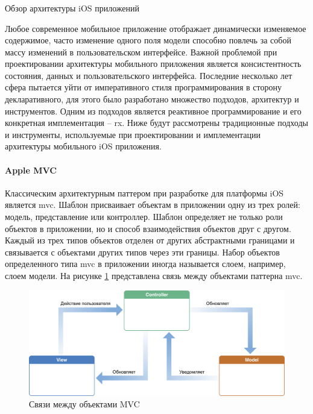 \subsubsection{} Обзор архитектуры iOS приложений
\label{sec:analysis:research:mobArch}

Любое современное мобильное приложение отображает динамически изменяемое содержимое, часто изменение одного поля модели способно повлечь за собой массу изменений в пользовательском интерфейсе. Важной проблемой при проектировании архитектуры мобильного приложения является консистентность состояния, данных и пользовательского интерфейса. Последние несколько лет сфера пытается уйти от императивного стиля программирования в сторону декларативного, для этого было разработано множество подходов, архитектур и инструментов. Одним из подходов является реактивное программирование и его конкретная имплементация -- \gls{rx}. Ниже будут рассмотрены традиционные подходы и инструменты, используемые при проектировании и имплементации архитектуры мобильного iOS приложения.

\paragraph {Apple MVC}
Классическим архитектурным паттером при разработке для платформы iOS является \gls{mvc}. Шаблон присваивает объектам в приложении одну из трех ролей: модель, представление или контроллер. Шаблон определяет не только роли объектов в приложении, но и способ взаимодействия объектов друг с другом. Каждый из трех типов объектов отделен от других абстрактными границами и связывается с объектами других типов через эти границы. Набор объектов определенного типа \gls{mvc} в приложении иногда называется слоем, например, слоем модели. \cite{apple:mvc} На рисунке \ref{sec:analysis:research:mobArch:apple-mvc:image:mvc} представлена связь между объектами паттерна \gls{mvc}.

\begin{figure}[h]
  \centering
    \includegraphics[width=1\textwidth]{inc/img/mvc.png}
  \caption{Связи между объектами MVC}
  \label{sec:analysis:research:mobArch:apple-mvc:image:mvc}
\end{figure}

